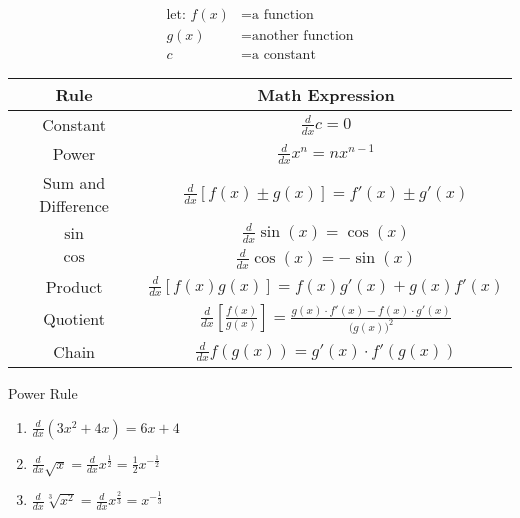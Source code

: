 \documentclass{MathNotes}
\begin{document}
\begin{align*}
    \text{let: } f(x)&= \text{a function}\\
                 g(x)&= \text{another function}\\
                   c &= \text{a constant}
\end{align*}
\begin{table}[h]
    \label{tab:2.2}
    \begin{center}
        \begin{tabular}{ |c|c| }
            \hline
            Rule & Math Expression\\
            \hline
            \hline
            Constant & $\frac{d}{dx}c=0$\\
            \hline
            Power & $\frac{d}{dx}x^n=nx^{n-1}$\\
            \hline
            Sum and Difference & $\frac{d}{dx}[f(x)\pm g(x)]=f'(x)\pm g'(x)$\\
            \hline
            $\sin$& $\frac{d}{dx}\sin(x)=\cos(x)$\\
            \hline
            $\cos$& $\frac{d}{dx}\cos(x)=-\sin(x)$\\
            \hline
            Product& 
                $\frac{d}{dx}[f(x)g(x)]=f(x)g'(x)+g(x)f'(x)$\\
            \hline
            Quotient& 
                $\frac{d}{dx}[\frac{f(x)}{g(x)}]=
                 \frac{g(x)\cdot f'(x)-f(x)\cdot g'(x)}{\bigl(g(x)\bigr)^2}$\\
            \hline
            Chain & $\frac{d}{dx}f(g(x))=g'(x)\cdot f'(g(x))$\\
            \hline
        \end{tabular}
    \end{center}
\end{table}

\begin{example}{Power Rule}
    \begin{multicols}{2}
        \begin{enumerate}
            \item $\frac{d}{dx}(3x^2+4x)=6x+4$
            \item $\frac{d}{dx}\sqrt{x}=\frac{d}{dx}x^{\frac{1}{2}}
                =\frac{1}{2}x^{-\frac{1}{2}}$
            \item $\frac{d}{dx}\sqrt[3]{x^2}=\frac{d}{dx}x^{\frac{2}{3}}
                =x^{-\frac{1}{3}}$
        \end{enumerate}
    \end{multicols}
\end{example}
\end{document}
